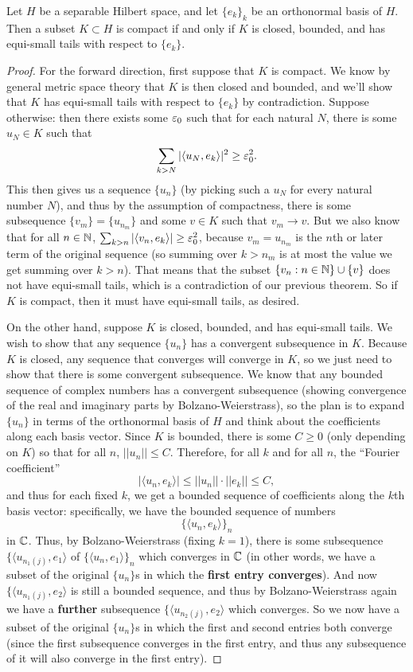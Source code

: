 \begin{theorem} 
Let $H$ be a separable Hilbert space, and let $\{e_k\}_k$ be an orthonormal basis of $H$. Then a subset $K \subset H$ is compact if and only if $K$ is closed, bounded, and has equi-small tails with respect to $\{e_k\}$.
\end{theorem}
\begin{proof}
For the forward direction, first suppose that $K$ is compact. We know by general metric space theory that $K$ is then closed and bounded, and we'll show that $K$ has equi-small tails with respect to $\{e_k\}$ by contradiction. Suppose otherwise: then there exists some $\varepsilon_0$ such that for each natural $N$, there is some $u_N \in K$ such that
\[
     \sum_{k>N} |\langle u_N, e_k \rangle|^2 \ge \varepsilon_0^2.
\]
This then gives us a sequence $\{u_n\}$ (by picking such a $u_N$ for every natural number $N$), and thus by the assumption of compactness, there is some subsequence $\{v_m\} = \{u_{n_m}\}$ and some $v \in K$ such that $v_m \to v$. But we also know that for all $n \in \mathbb N$, $\sum_{k>n} |\langle v_n, e_k \rangle| \ge \varepsilon_0^2$, because $v_m = u_{n_m}$ is the $n$th or later term of the original sequence (so summing over $k > n_m$ is at most the value we get summing over $k > n$). That means that the subset $\{v_n: n \in \mathbb N\} \cup \{v\}$ does not have equi-small tails, which is a contradiction of our previous theorem. So if $K$ is compact, then it must have equi-small tails, as desired. 

On the other hand, suppose $K$ is closed, bounded, and has equi-small tails. We wish to show that any sequence $\{u_n\}$ has a convergent subsequence in $K$. Because $K$ is closed, any sequence that converges will converge in $K$, so we just need to show that there is some convergent subsequence. We know that any bounded sequence of complex numbers has a convergent subsequence (showing convergence of the real and imaginary parts by Bolzano-Weierstrass), so the plan is to expand $\{u_n\}$ in terms of the orthonormal basis of $H$ and think about the coefficients along each basis vector. Since $K$ is bounded, there is some $C \ge 0$ (only depending on $K$) so that for all $n$, $||u_n|| \le C$. Therefore, for all $k$ and for all $n$, the ``Fourier coefficient'' 
\[
    |\langle u_n, e_k \rangle| \le ||u_n|| \cdot ||e_k|| \le C,
\]
and thus for each fixed $k$, we get a bounded sequence of coefficients along the $k$th basis vector: specifically, we have the bounded sequence of numbers
\[
    \{\langle u_n, e_k \rangle\}_n
\]
in $\mathbb C$. Thus, by Bolzano-Weierstrass (fixing $k = 1$), there is some subsequence $\{\langle u_{n_1(j)}, e_1 \rangle$ of $\{\langle u_n, e_1 \rangle\}_n$ which converges in $\mathbb C$ (in other words, we have a subset of the original $\{u_n\}$s in which the \textbf{first entry converges}). And now $\{\langle u_{n_1(j)}, e_2 \rangle$ is still a bounded sequence, and thus by Bolzano-Weierstrass again we have a \textbf{further} subsequence $\{\langle u_{n_2(j)}, e_2 \rangle$ which converges. So we now have a subset of the original $\{u_n\}$s in which the first and second entries both converge (since the first subsequence converges in the first entry, and thus any subsequence of it will also converge in the first entry). 


\end{proof}
